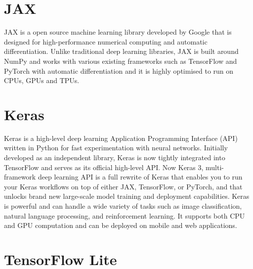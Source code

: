 \section{JAX}
\label{sec:JAX}
JAX is a open source machine learning library developed by Google that is designed for high-performance numerical computing and automatic differentiation. Unlike traditional deep learning libraries, JAX is built around NumPy and works with various existing frameworks such as TensorFlow and PyTorch with automatic differentiation and it is highly optimised to run on CPUs, GPUs and TPUs. \cite{jax:2024}

\section{Keras}
\label{sec:Keras}
Keras is a high-level deep learning Application Programming Interface (API) written in Python for fast experimentation with neural networks. Initially developed as an independent library, Keras is now tightly integrated into TensorFlow and serves as its official high-level API. Now Keras 3, multi-framework deep learning API is a full rewrite of Keras that enables you to run your Keras workflows on top of either JAX, TensorFlow, or PyTorch, and that unlocks brand new large-scale model training and deployment capabilities. Keras is powerful and can handle a wide variety of tasks such as image classification, natural language processing, and reinforcement learning. It supports both CPU and GPU computation and can be deployed on mobile and web applications. \cite{keras:2024}

\section{TensorFlow Lite}
\label{sec:TensorFlow Lite}

